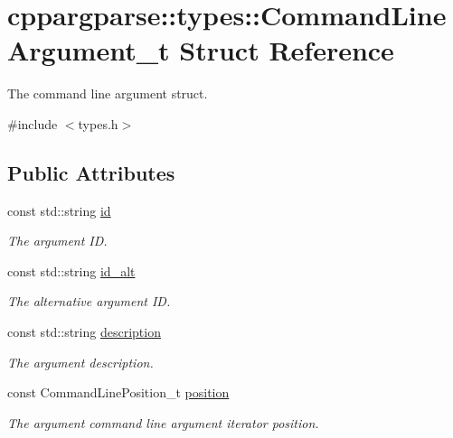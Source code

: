 \hypertarget{structcppargparse_1_1types_1_1CommandLineArgument__t}{}\section{cppargparse\+:\+:types\+:\+:Command\+Line\+Argument\+\_\+t Struct Reference}
\label{structcppargparse_1_1types_1_1CommandLineArgument__t}


The command line argument struct.  




{\ttfamily \#include $<$types.\+h$>$}

\subsection*{Public Attributes}
\begin{DoxyCompactItemize}
\item 
const std\+::string \hyperlink{structcppargparse_1_1types_1_1CommandLineArgument__t_afbbbb28758ea93a22d7bc9520acb9205}{id}
\begin{DoxyCompactList}\small\item\em The argument ID. \end{DoxyCompactList}\item 
const std\+::string \hyperlink{structcppargparse_1_1types_1_1CommandLineArgument__t_a7fd5fda4e06af1ad54daa0951ca8ff02}{id\+\_\+alt}
\begin{DoxyCompactList}\small\item\em The alternative argument ID. \end{DoxyCompactList}\item 
const std\+::string \hyperlink{structcppargparse_1_1types_1_1CommandLineArgument__t_a2c001819f7a00e3b42277ace1a2f697b}{description}
\begin{DoxyCompactList}\small\item\em The argument description. \end{DoxyCompactList}\item 
const Command\+Line\+Position\+\_\+t \hyperlink{structcppargparse_1_1types_1_1CommandLineArgument__t_a942c3909aa9951e8e06fa2b3aaa77054}{position}
\begin{DoxyCompactList}\small\item\em The argument command line argument iterator position. \end{DoxyCompactList}\end{DoxyCompactItemize}


